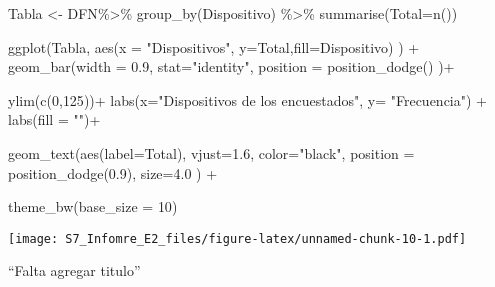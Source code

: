 \documentclass[
]{article}
\newenvironment{Shaded}{\begin{snugshade}}{\end{snugshade}}
\newcommand{\AttributeTok}[1]{\textcolor[rgb]{0.77,0.63,0.00}{#1}}
\newcommand{\DecValTok}[1]{\textcolor[rgb]{0.00,0.00,0.81}{#1}}
\newcommand{\FloatTok}[1]{\textcolor[rgb]{0.00,0.00,0.81}{#1}}
\newcommand{\FunctionTok}[1]{\textcolor[rgb]{0.00,0.00,0.00}{#1}}
\newcommand{\NormalTok}[1]{#1}
\newcommand{\OtherTok}[1]{\textcolor[rgb]{0.56,0.35,0.01}{#1}}
\newcommand{\SpecialCharTok}[1]{\textcolor[rgb]{0.00,0.00,0.00}{#1}}
\newcommand{\StringTok}[1]{\textcolor[rgb]{0.31,0.60,0.02}{#1}}
\begin{document}
\begin{Shaded}
\begin{Highlighting}[]
\NormalTok{Tabla }\OtherTok{\textless{}{-}}\NormalTok{ DFN}\SpecialCharTok{\%\textgreater{}\%} \FunctionTok{group\_by}\NormalTok{(Dispositivo) }\SpecialCharTok{\%\textgreater{}\%} \FunctionTok{summarise}\NormalTok{(}\AttributeTok{Total=}\FunctionTok{n}\NormalTok{())   }
    
\FunctionTok{ggplot}\NormalTok{(Tabla, }\FunctionTok{aes}\NormalTok{(}\AttributeTok{x =} \StringTok{"Dispositivos"}\NormalTok{, }\AttributeTok{y=}\NormalTok{Total,}\AttributeTok{fill=}\NormalTok{Dispositivo) ) }\SpecialCharTok{+}    
  \FunctionTok{geom\_bar}\NormalTok{(}\AttributeTok{width =} \FloatTok{0.9}\NormalTok{, }\AttributeTok{stat=}\StringTok{"identity"}\NormalTok{,              }
           \AttributeTok{position =} \FunctionTok{position\_dodge}\NormalTok{()                 )}\SpecialCharTok{+}  
  
  \FunctionTok{ylim}\NormalTok{(}\FunctionTok{c}\NormalTok{(}\DecValTok{0}\NormalTok{,}\DecValTok{125}\NormalTok{))}\SpecialCharTok{+}
  \FunctionTok{labs}\NormalTok{(}\AttributeTok{x=}\StringTok{"Dispositivos de los encuestados"}\NormalTok{, }\AttributeTok{y=} \StringTok{"Frecuencia"}\NormalTok{) }\SpecialCharTok{+}   
  \FunctionTok{labs}\NormalTok{(}\AttributeTok{fill =} \StringTok{""}\NormalTok{)}\SpecialCharTok{+}                                         
  
  \FunctionTok{geom\_text}\NormalTok{(}\FunctionTok{aes}\NormalTok{(}\AttributeTok{label=}\NormalTok{Total), }\AttributeTok{vjust=}\FloatTok{1.6}\NormalTok{, }\AttributeTok{color=}\StringTok{"black"}\NormalTok{,    }
              \AttributeTok{position =} \FunctionTok{position\_dodge}\NormalTok{(}\FloatTok{0.9}\NormalTok{),  }\AttributeTok{size=}\FloatTok{4.0}
\NormalTok{            ) }\SpecialCharTok{+}                                            
  
  \FunctionTok{theme\_bw}\NormalTok{(}\AttributeTok{base\_size =} \DecValTok{10}\NormalTok{)}
\end{Highlighting}
\end{Shaded}

\texttt{[image: S7\_Infomre\_E2\_files/figure-latex/unnamed-chunk-10-1.pdf]}

``Falta agregar titulo''
\end{document}

